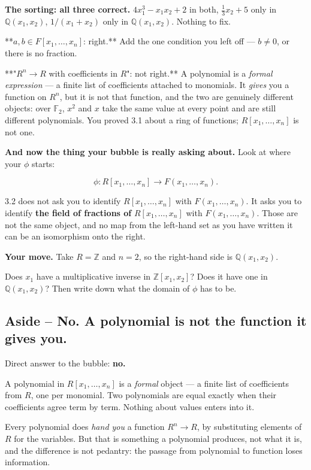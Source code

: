 \documentclass[11pt]{article}
\begin{document}
\textbf{The sorting: all three correct.} $4x_1^3 - x_1x_2 + 2$ in both, $\tfrac13x_2 + 5$ only in $\mathbb{Q}(x_1,x_2)$, $1/(x_1+x_2)$ only in $\mathbb{Q}(x_1,x_2)$. Nothing to fix.

**$a, b \in F[x_1,\ldots,x_n]$: right.** Add the one condition you left off --- $b \neq 0$, or there is no fraction.

**"$R^n \to R$ with coefficients in $R$": not right.** A polynomial is a \emph{formal expression} --- a finite list of coefficients attached to monomials. It \emph{gives} you a function on $R^n$, but it is not that function, and the two are genuinely different objects: over $\mathbb{F}_2$, $x^2$ and $x$ take the same value at every point and are still different polynomials. You proved 3.1 about a ring of functions; $R[x_1,\ldots,x_n]$ is not one.

\textbf{And now the thing your bubble is really asking about.} Look at where your $\phi$ starts:

$$\phi : R[x_1,\ldots,x_n] \longrightarrow F(x_1,\ldots,x_n).$$

3.2 does not ask you to identify $R[x_1,\ldots,x_n]$ with $F(x_1,\ldots,x_n)$. It asks you to identify \textbf{the field of fractions of} $R[x_1,\ldots,x_n]$ with $F(x_1,\ldots,x_n)$. Those are not the same object, and no map from the left-hand set as you have written it can be an isomorphism onto the right.

\textbf{Your move.} Take $R = \mathbb{Z}$ and $n = 2$, so the right-hand side is $\mathbb{Q}(x_1,x_2)$.

Does $x_1$ have a multiplicative inverse in $\mathbb{Z}[x_1,x_2]$? Does it have one in $\mathbb{Q}(x_1,x_2)$? Then write down what the domain of $\phi$ has to be.


\subsection*{Aside -- No. A polynomial is not the function it gives you.}
Direct answer to the bubble: \textbf{no.}

A polynomial in $R[x_1,\ldots,x_n]$ is a \emph{formal} object --- a finite list of coefficients from $R$, one per monomial. Two polynomials are equal exactly when their coefficients agree term by term. Nothing about values enters into it.

Every polynomial does \emph{hand you} a function $R^n \to R$, by substituting elements of $R$ for the variables. But that is something a polynomial produces, not what it is, and the difference is not pedantry: the passage from polynomial to function loses information.
\end{document}

